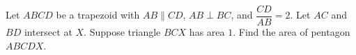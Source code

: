 Let $ABCD$ be a trapezoid with $AB\parallel CD$, $AB\perp BC$, and $\dfrac{CD}{AB}=2$. Let $AC$ and $BD$ intersect at $X$. Suppose triangle $BCX$ has area $1$. Find the area of pentagon $ABCDX$.

